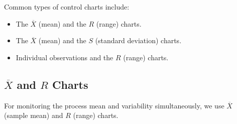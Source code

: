 \documentclass[twoside]{book}
\begin{document}
Common types of control charts include:
\begin{itemize}
\item The $ \overline{X}$ (mean) and the $ R $ (range) charts.
\item The $ \overline{X}$ (mean) and the $ S $ (standard deviation) charts.
\item Individual observations and the $ R $ (range) charts.
\end{itemize}

\subsection{$\overline{X}$ and $ R $ Charts}

For monitoring the process mean and variability simultaneously, we use $\overline{X}$ (sample mean) and $ R $ (range) charts.
\end{document}
